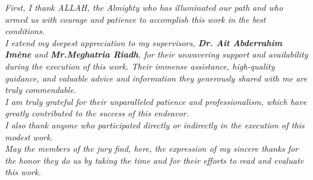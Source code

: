 \begin{center}
\it \Large
First, I thank ALLAH, the Almighty who has illuminated our path and who armed us with courage and patience to accomplish this work in the best conditions.\\[12pt] 

I extend my deepest appreciation to my supervisors, \textbf{Dr. Ait Abderrahim Imène} and \textbf{Mr.Meghatria Riadh}, for their unwavering support and availability during the execution of this work. Their immense assistance, high-quality guidance, and valuable advice and information they generously shared with me are truly commendable.\\[12pt]

I am truly grateful for their unparalleled patience and professionalism, which have greatly contributed to the success of this endeavor.\\[12pt]

I also thank anyone who participated directly or indirectly in the execution of this modest work.\\[12pt]

May the members of the jury find, here, the expression of my sincere thanks for the honor they do us by taking the time and for their efforts to read and evaluate this work.\\[12pt]
\end{center}
\clearpage